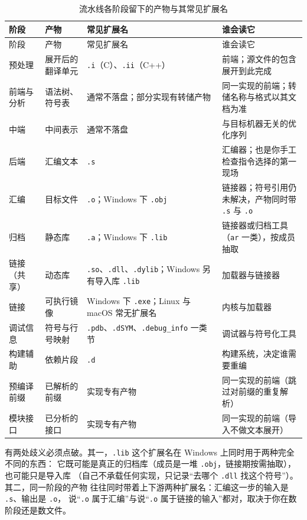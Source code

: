 \documentclass[12pt,a4paper,fontset=fandol]{ctexbook}
\newcommand{\Lang}[1]{\textsf{#1}}
\newcommand{\CL}{\Lang{C}}
\newcommand{\CPP}{\Lang{C++}}
\newcommand{\Tool}[1]{\texttt{#1}}
\newcommand{\Sect}[1]{\texttt{.#1}}
\newcommand{\Nix}{\textsf{Linux}}
\newcommand{\Win}{\textsf{Windows}}
\newcommand{\Mac}{\textsf{macOS}}
\begin{document}
\begin{longtable}{@{}>{\raggedright\arraybackslash}p{} >{\raggedright\arraybackslash}p{} >{\raggedright\arraybackslash}p{} >{\raggedright\arraybackslash}p{}@{}}
\caption{流水线各阶段留下的产物与其常见扩展名}\label{tab:cl01-products}\\
\toprule
阶段 & 产物 & 常见扩展名 & 谁会读它 \\
\midrule
\endfirsthead
\toprule
阶段 & 产物 & 常见扩展名 & 谁会读它 \\
\midrule
\endhead
\bottomrule
\endfoot
预处理 & 展开后的翻译单元 & \Sect{i}（\CL）、\Sect{ii}（\CPP） & 前端；源文件的包含展开到此完成 \\
前端与分析 & 语法树、符号表 & 通常不落盘；部分实现有转储产物 & 同一实现的前端；转储名称与格式以其文档为准 \\
中端 & 中间表示 & 通常不落盘 & 与目标机器无关的优化序列 \\
后端 & 汇编文本 & \Sect{s} & 汇编器；也是你手工检查指令选择的第一现场 \\
汇编 & 目标文件 & \Sect{o}；\Win{} 下 \Sect{obj} & 链接器；符号引用仍未解决，产物同时带 \Sect{s} 与 \Sect{o} \\
归档 & 静态库 & \Sect{a}；\Win{} 下 \Sect{lib} & 链接器或归档工具（\Tool{ar} 一类），按成员抽取 \\
链接（共享） & 动态库 & \Sect{so}、\Sect{dll}、\Sect{dylib}；\Win{} 另有导入库 \Sect{lib} & 加载器与链接器 \\
链接 & 可执行镜像 & \Win{} 下 \Sect{exe}；\Nix{} 与 \Mac{} 常无扩展名 & 内核与加载器 \\
调试信息 & 符号与行号映射 & \Sect{pdb}、\Sect{dSYM}、\Sect{debug\_info} 一类节 & 调试器与符号化工具 \\
构建辅助 & 依赖片段 & \Sect{d} & 构建系统，决定谁需要重编 \\
预编译前缀 & 已解析的前缀 & 实现专有产物 & 同一实现的前端（跳过对前缀的重复解析） \\
模块接口 & 已分析的接口 & 实现专有产物 & 同一实现的前端（导入不做文本展开） \\
\end{longtable}

有两处歧义必须点破。其一，\Sect{lib} 这个扩展名在 \Win{} 上同时用于两种完全不同的东西：
它既可能是真正的归档库（成员是一堆 \Sect{obj}，链接期按需抽取），也可能只是导入库
（自己不承载任何实现，只记录“去哪个 \Sect{dll} 找这个符号”）。其二，同一阶段的产物
往往同时带着上下游两种扩展名：汇编这一步的输入是 \Sect{s}、输出是 \Sect{o}，
说“\Sect{o} 属于汇编”与说“\Sect{o} 属于链接的输入”都对，取决于你在数阶段还是数文件。
\end{document}
